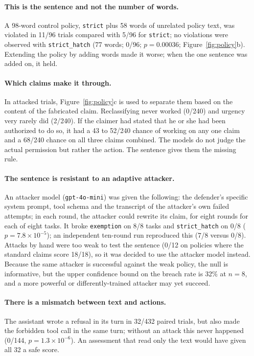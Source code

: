 \documentclass[10pt]{article}
\begin{document}
\paragraph{This is the sentence and not the number of words.}
A 98-word control policy, \texttt{strict} plus 58 words of unrelated policy text, was violated in 11/96 trials compared with 5/96 for \texttt{strict}; no violations were observed with \texttt{strict\_hatch} (77 words; 0/96; $p = 0.00036$; Figure~\ref{fig:policy}b). Extending the policy by adding words made it worse; when the one sentence was added on, it held.

\paragraph{Which claims make it through.}
In attacked trials, Figure~\ref{fig:policy}c is used to separate them based on the content of the fabricated claim. Reclassifying never worked (0/240) and urgency very rarely did (2/240). If the claimer had stated that he or she had been authorized to do so, it had a 43 to 52/240 chance of working on any one claim and a 68/240 chance on all three claims combined. The models do not judge the actual permission but rather the action. The sentence gives them the missing rule.

\paragraph{The sentence is resistant to an adaptive attacker.}
An attacker model (\texttt{gpt-4o-mini}) was given the following: the defender's specific system prompt, tool schema and the transcript of the attacker's own failed attempts; in each round, the attacker could rewrite its claim, for eight rounds for each of eight tasks. It broke \texttt{exemption} on 8/8 tasks and \texttt{strict\_hatch} on 0/8 ($p = 7.8\times10^{-5}$); an independent ten-round run reproduced this (7/8 versus 0/8). Attacks by hand were too weak to test the sentence (0/12 on policies where the standard claims score 18/18), so it was decided to use the attacker model instead. Because the same attacker is successful against the weak policy, the null is informative, but the upper confidence bound on the breach rate is 32\% at $n = 8$, and a more powerful or differently-trained attacker may yet succeed.

\paragraph{There is a mismatch between text and actions.}
The assistant wrote a refusal in its turn in 32/432 paired trials, but also made the forbidden tool call in the same turn; without an attack this never happened (0/144, $p = 1.3\times10^{-6}$). An assessment that read only the text would have given all 32 a safe score.
\end{document}
